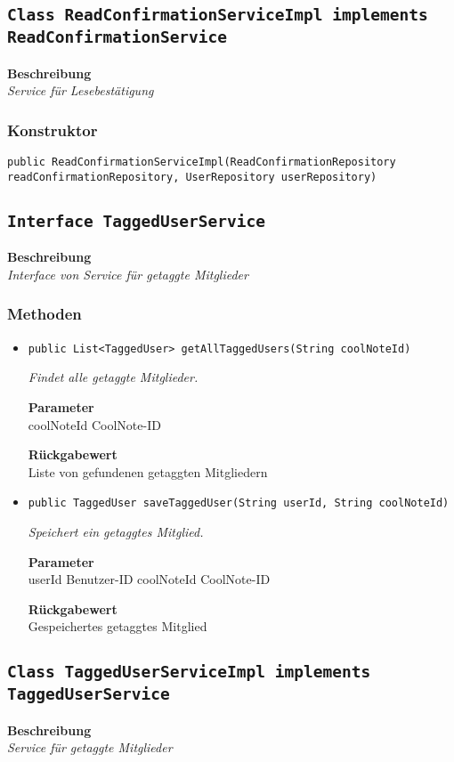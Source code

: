     \subsection{\texttt{Class ReadConfirmationServiceImpl implements ReadConfirmationService}}
    \textbf{Beschreibung} \\
    \textit{Service für Lesebestätigung}
    \subsubsection*{Konstruktor}
    \texttt{public ReadConfirmationServiceImpl(ReadConfirmationRepository readConfirmationRepository, UserRepository userRepository)}
    \subsection{\texttt{Interface TaggedUserService}}
    \textbf{Beschreibung} \\
    \textit{Interface von Service für getaggte Mitglieder}
    \subsubsection*{Methoden}
    \begin{itemize}
    	\item{\texttt{public List<TaggedUser> getAllTaggedUsers(String coolNoteId)}}
    	
    	\textit{Findet alle getaggte Mitglieder.}
    	
    	\textbf{Parameter} \\
    	coolNoteId CoolNote-ID
    	
    	\textbf{Rückgabewert} \\
    	Liste von gefundenen getaggten Mitgliedern        \item{\texttt{public TaggedUser saveTaggedUser(String userId, String coolNoteId)}}
    	
    	\textit{Speichert ein getaggtes Mitglied.}
    	
    	\textbf{Parameter} \\
    	userId Benutzer-ID
    	coolNoteId CoolNote-ID
    	
    	\textbf{Rückgabewert} \\
    	Gespeichertes getaggtes Mitglied
    \end{itemize}
    \subsection{\texttt{Class TaggedUserServiceImpl implements TaggedUserService}}
    \textbf{Beschreibung} \\
    \textit{Service für getaggte Mitglieder}
